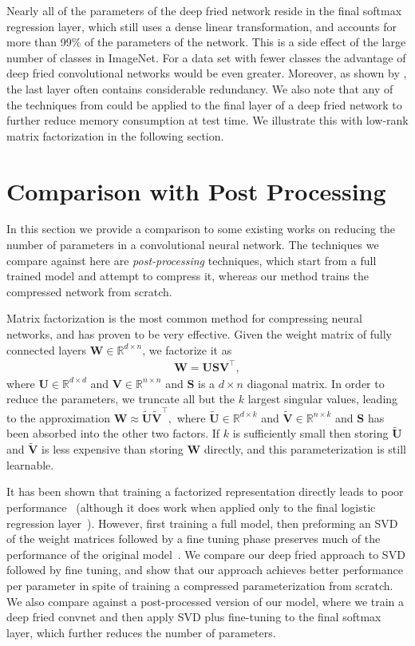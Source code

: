 \documentclass[10pt,twocolumn,letterpaper]{article}
\newcommand{\myvec}[1]{\mathbf{#1}}
\newcommand{\vS}{\myvec{S}}
\newcommand{\vU}{\myvec{U}}
\newcommand{\vV}{\myvec{V}}
\newcommand{\vW}{\myvec{W}}
\begin{document}
Nearly all of the parameters of the deep fried network reside in the final
softmax regression layer, which still uses a dense linear transformation, and
accounts for more than 99\% of the parameters of the network.  This is
a side effect of the large number of classes in ImageNet.  For a data set with
fewer classes the advantage of deep fried convolutional networks would be even
greater.  Moreover, as shown by \cite{DenilSDRF13,SainathKSAR13}, the last layer often
contains considerable redundancy.  We also note that any of the techniques from \cite{Collins2014,Chen2015} could be applied to the final layer of a deep fried
network to further reduce memory consumption at test time. We illustrate this with low-rank matrix factorization in the following section.

\section{Comparison with Post Processing}

In this section we provide a comparison to some existing works on reducing the number of parameters in a convolutional neural network.  The techniques we compare against here are \emph{post-processing} techniques, which start from a full trained model and attempt to compress it, whereas our method trains the compressed network from scratch.

Matrix factorization is the most common method for compressing neural networks, and has proven to be very effective.  Given
  the weight matrix of fully connected layers $\vW \in \mathbb{R}^{d\times n}$, we
  factorize it as
\begin{align*}
  \vW = \vU\vS\vV^{\top},
\end{align*}
where $\vU \in \mathbb{R}^{d \times d}$ and $\vV \in \mathbb{R}^{n \times n}$ and $\vS$ is a $d\times
n$ diagonal matrix. In order to reduce the parameters, we truncate all but the $k$ largest singular values, leading to the approximation
$
\vW \approx \tilde{\vU}\tilde{\vV}^{\top},
$
where $\tilde{\vU} \in \mathbb{R}^{d \times k}$ and $\tilde{\vV} \in \mathbb{R}^{n \times k}$ and $\vS$ has been absorbed into the other two factors.  If $k$ is sufficiently small then storing $\tilde{\vU}$ and $\tilde{\vV}$ is less expensive than storing $\vW$ directly, and this parameterization is still learnable.



It has been shown that training a factorized representation directly leads to poor performance~\cite{DenilSDRF13} (although it does work when applied only to the final logistic regression layer~\cite{SainathKSAR13}).  However, first training a full model, then preforming an SVD of the weight matrices followed by a fine tuning phase preserves much of the performance of the original model~\cite{XueLG13}.  We compare our deep fried approach to SVD followed by fine tuning, and show that our approach achieves better performance per parameter in spite of training a compressed parameterization from scratch.  We also compare against a post-processed version of our model, where we train a deep fried convnet and then apply SVD plus fine-tuning to the final softmax layer, which further reduces the number of parameters.  
\end{document}
